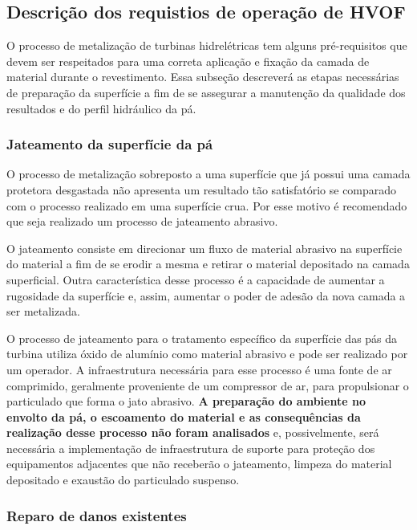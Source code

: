 \subsection{Descrição dos requistios de operação de HVOF}

O processo de metalização de turbinas hidrelétricas tem alguns pré-requisitos
que devem ser respeitados para uma correta aplicação e fixação da camada de
material durante o revestimento. Essa subseção descreverá as etapas necessárias
de preparação da superfície a fim de se assegurar a manutenção da qualidade dos resultados e do
perfil hidráulico da pá. 

\subsubsection{Jateamento da superfície da pá}

O processo de metalização sobreposto a uma superfície que já possui uma camada
protetora desgastada não apresenta um resultado tão satisfatório se comparado
com o processo realizado em uma superfície crua. Por esse motivo é recomendado
que seja realizado um processo de jateamento abrasivo. 

O jateamento consiste em direcionar um fluxo de material abrasivo na superfície
do material a fim de se erodir a mesma e retirar o material depositado na camada
superficial. Outra característica desse processo é a capacidade de aumentar a
rugosidade da superfície e, assim, aumentar o poder de adesão da nova camada a
ser metalizada.  

O processo de jateamento para o tratamento específico da superfície das pás da
turbina utiliza óxido de alumínio como material abrasivo e pode ser realizado
por um operador. A infraestrutura necessária para esse processo é uma fonte de
ar comprimido, geralmente proveniente de um compressor de ar, para propulsionar
o particulado que forma o jato abrasivo. \textbf{A preparação do ambiente no envolto da pá, 
o escoamento do material e
as consequências da realização desse processo não foram analisados} e,
possivelmente, será necessária a implementação de infraestrutura de suporte
para proteção dos equipamentos adjacentes que não receberão o jateamento,
limpeza do material depositado e exaustão do particulado suspenso.

\subsubsection{Reparo de danos existentes}


